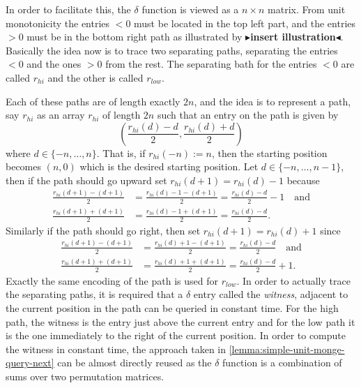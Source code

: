\documentclass[twoside,11pt,openright]{report}
\newcommand{\todo}[1]{{\color[rgb]{.5,0,0}\textbf{$\blacktriangleright$#1$\blacktriangleleft$}}}
\begin{document}
In order to facilitate this, the $\delta$ function is viewed as a $n \times n$ matrix. From unit monotonicity the entries $< 0$ must be located in the top left part, and the entries $> 0$ must be in the bottom right path as illustrated by \todo{insert illustration}. Basically the idea now is to trace two separating paths, separating the entries $< 0$ and the ones $> 0$ from the rest. The separating bath for the entries $< 0$ are called $r_{hi}$ and the other is called $r_{low}$.

Each of these paths are of length exactly $2n$, and the idea is to represent a path, say $r_{hi}$ as an array $r_{hi}$ of length $2n$ such that an entry on the path is given by
\[
  \left( \frac{r_{hi}(d) - d}{2}, \frac{r_{hi}(d) + d}{2} \right)
\]
where $d \in \{-n, \dots, n\}$. That is, if $r_{hi}(-n) := n$, then the starting position becomes $(n, 0)$ which is the desired starting position. Let $d \in \{-n, \dots, n - 1\}$, then if the path should go upward set $r_{hi}(d + 1) = r_{hi}(d) - 1$ because
\begin{align*}
  \frac{r_{hi}(d + 1) - (d + 1)}{2} &= \frac{r_{hi}(d) - 1 - (d + 1)}{2} = \frac{r_{hi}(d) - d}{2} - 1 \quad \text{and} \\
  \frac{r_{hi}(d + 1) + (d + 1)}{2} &= \frac{r_{hi}(d) - 1 + (d + 1)}{2} = \frac{r_{hi}(d) - d}{2}.
\end{align*}
Similarly if the path should go right, then set $r_{hi}(d + 1) = r_{hi}(d) + 1$ since
\begin{align*}
  \frac{r_{hi}(d + 1) - (d + 1)}{2} &= \frac{r_{hi}(d) + 1 - (d + 1)}{2} = \frac{r_{hi}(d) - d}{2} \quad \text{and} \\
  \frac{r_{hi}(d + 1) + (d + 1)}{2} &= \frac{r_{hi}(d) + 1 + (d + 1)}{2} = \frac{r_{hi}(d) - d}{2} + 1.
\end{align*}
Exactly the same encoding of the path is used for $r_{low}$. In order to actually trace the separating paths, it is required that a $\delta$ entry called the \textit{witness}, adjacent to the current position in the path can be queried in constant time. For the high path, the witness is the entry just above the current entry and for the low path it is the one immediately to the right of the current position. In order to compute the witness in constant time, the approach taken in \cref{lemma:simple-unit-monge-query-next} can be almost directly reused as the $\delta$ function is a combination of sums over two permutation matrices.
\end{document}
